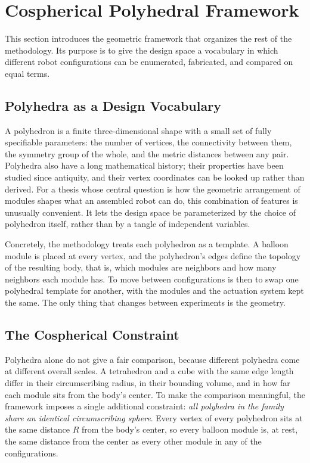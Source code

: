 \section{Cospherical Polyhedral Framework}
\label{sec:cospherical-framework}

This section introduces the geometric framework that organizes the rest of the methodology. Its purpose is to give the design space a vocabulary in which different robot configurations can be enumerated, fabricated, and compared on equal terms.

\subsection{Polyhedra as a Design Vocabulary}
\label{subsec:polyhedral-vocabulary}

A polyhedron is a finite three-dimensional shape with a small set of fully specifiable parameters: the number of vertices, the connectivity between them, the symmetry group of the whole, and the metric distances between any pair. Polyhedra also have a long mathematical history; their properties have been studied since antiquity, and their vertex coordinates can be looked up rather than derived. For a thesis whose central question is how the geometric arrangement of modules shapes what an assembled robot can do, this combination of features is unusually convenient. It lets the design space be parameterized by the choice of polyhedron itself, rather than by a tangle of independent variables.

Concretely, the methodology treats each polyhedron as a template. A balloon module is placed at every vertex, and the polyhedron's edges define the topology of the resulting body, that is, which modules are neighbors and how many neighbors each module has. To move between configurations is then to swap one polyhedral template for another, with the modules and the actuation system kept the same. The only thing that changes between experiments is the geometry.

\subsection{The Cospherical Constraint}
\label{subsec:cospherical-constraint}

Polyhedra alone do not give a fair comparison, because different polyhedra come at different overall scales. A tetrahedron and a cube with the same edge length differ in their circumscribing radius, in their bounding volume, and in how far each module sits from the body's center. To make the comparison meaningful, the framework imposes a single additional constraint: \textit{all polyhedra in the family share an identical circumscribing sphere}. Every vertex of every polyhedron sits at the same distance \(R\) from the body's center, so every balloon module is, at rest, the same distance from the center as every other module in any of the configurations.


